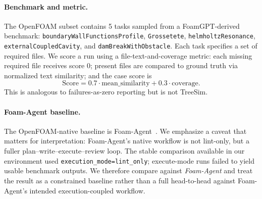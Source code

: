 \documentclass{article}
\begin{document}
\paragraph{Benchmark and metric.}
The OpenFOAM subset contains 5 tasks sampled from a FoamGPT-derived benchmark: \texttt{boundaryWallFunctionsProfile}, \texttt{Grossetete}, \texttt{helmholtzResonance}, \texttt{externalCoupledCavity}, and \texttt{damBreakWithObstacle}. Each task specifies a set of required files. We score a run using a file-text-and-coverage metric: each missing required file receives score 0; present files are compared to ground truth via normalized text similarity; and the case score is
\[
\mathrm{Score} = 0.7 \cdot \mathrm{mean\_similarity} + 0.3 \cdot \mathrm{coverage}.
\]
This is analogous to failures-as-zero reporting but is not TreeSim.

\paragraph{Foam-Agent baseline.}
The OpenFOAM-native baseline is Foam-Agent~\citep{foamagent2025}. We emphasize a caveat that matters for interpretation: Foam-Agent's native workflow is not lint-only, but a fuller plan--write--execute--review loop. The stable comparison available in our environment used \texttt{execution\_mode=lint\_only}; execute-mode runs failed to yield usable benchmark outputs. We therefore compare against \emph{Foam-Agent} and treat the result as a constrained baseline rather than a full head-to-head against Foam-Agent's intended execution-coupled workflow.
\end{document}
